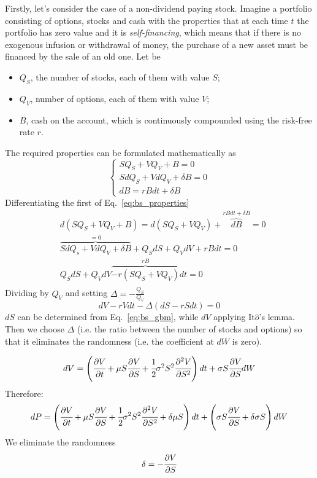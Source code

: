 Firstly, let's consider the case of a non-dividend paying stock. Imagine a portfolio consisting of options, stocks and cash with the properties that at each time $t$ the portfolio has zero value and it is \emph{self-financing}, which means that if there is no exogenous infusion or withdrawal of money, the purchase of a new asset must be financed by the sale of an old one. Let be 
\begin{itemize}
\item $Q_S$, the number of stocks, each of them with value $S$;
\item $Q_V$, number of options, each of them with value $V$;
\item $B$, cash on the account, which is continuously compounded using the risk-free rate $r$.
\end{itemize}
The required properties can be formulated mathematically as
\begin{equation}
\begin{cases}
SQ_S+VQ_V+B=0 \\
SdQ_S + V dQ_V +\delta B = 0 \\
dB = rBdt+\delta B
\end{cases}
\label{eq:bs_properties}
\end{equation}
Differentiating the first of Eq.~\ref{eq:bs_properties}
\begin{equation}
\begin{split}
&d(SQ_S + VQ_V +B) = d(SQ_S + VQ_V) + \overbrace{dB}^{rBdt+\delta B} = 0 \\
& \overbrace{SdQ_s + VdQ_V +\delta B}^{=0} + Q_S dS + Q_V dV + rBdt = 0 \\
& Q_SdS+Q_VdV \overbrace{-r(SQ_S + VQ_V)}^{rB}dt=0\\
\end{split} 
\end{equation}
Dividing by $Q_V$ and setting $\Delta = -\frac{Q_S}{Q_V}$
\begin{equation}
dV -rVdt-\Delta (dS - rSdt)=0
\end{equation}
$dS$ can be determined from Eq.~\ref{eq:bs_gbm}, while $dV$ applying It$\hat{o}$'s lemma. Then we choose $\Delta$ (i.e. the ratio between the number of stocks and options) so that it eliminates the randomness (i.e. the coefficient at $dW$ is zero).
  
\begin{equation}
dV = \left(\cfrac{\partial V}{\partial t} + \mu S  \cfrac{\partial V}{\partial S} + \cfrac{1}{2} \sigma^2 S^2  \cfrac{\partial^2 V}{\partial S^2} \right) dt + \sigma S \cfrac{\partial V}{\partial S} dW
\end{equation} 
Therefore:
\begin{equation}
dP =  \left(\cfrac{\partial V}{\partial t} + \mu S  \cfrac{\partial V}{\partial S} + \cfrac{1}{2} \sigma^2 S^2  \cfrac{\partial^2 V}{\partial S^2} + \delta \mu S\right) dt + \left(\sigma S  \cfrac{\partial V}{\partial S} + \delta \sigma S \right)dW
\end{equation}
We eliminate the randomness
\begin{equation}
\delta = -\cfrac{\partial V}{\partial S}
\end{equation}

